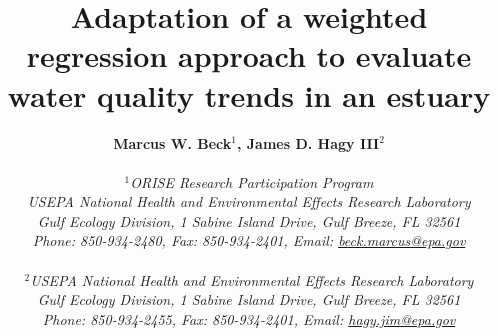 \documentclass[letterpaper,12pt,oneside]{article}\usepackage[]{graphicx}\usepackage[]{color}
\begin{document}
\raggedbottom
\linenumbers
\raggedright
{}
\setlength{\parindent}{0.5in}
\renewcommand\refname{References \vspace{12pt}}

\begin{singlespace}
\title{{\bf {\Large Adaptation of a weighted regression approach to evaluate water quality trends in an estuary}}}
\author{
  {\bf {\normalsize Marcus W. Beck$^1$, James D. Hagy III$^2$}}
	\\\\{\textit {\normalsize $^1$ORISE Research Participation Program}}
  \\{\textit {\normalsize USEPA National Health and Environmental Effects Research Laboratory}}
	\\{\textit {\normalsize Gulf Ecology Division, 1 Sabine Island Drive, Gulf Breeze, FL 32561}}
	\\{\textit {\normalsize Phone: 850-934-2480, Fax: 850-934-2401, Email: \href{mailto:beck.marcus@epa.gov}{beck.marcus@epa.gov}}}
	\\\\{\textit {\normalsize $^2$USEPA National Health and Environmental Effects Research Laboratory}}
	\\{\textit {\normalsize Gulf Ecology Division, 1 Sabine Island Drive, Gulf Breeze, FL 32561}}
	\\{\textit {\normalsize Phone: 850-934-2455, Fax: 850-934-2401, Email: \href{mailto:hagy.jim@epa.gov}{hagy.jim@epa.gov}}}
	}
\date{}
\maketitle
\end{singlespace}

\clearpage
\end{document}
